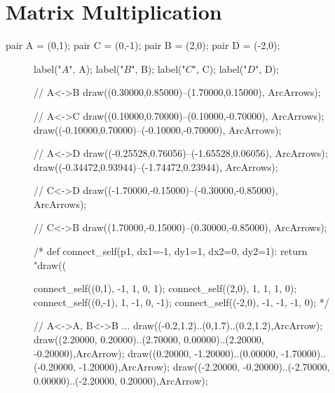 \documentclass[../gatm.tex]{subfiles}
\begin{document}
\section{Matrix Multiplication}

\newcommand{\indsize}{\scriptsize}
\newcommand{\colind}[2]{\displaystyle\smash{\mathop{#1}^{\raisebox{.5\normalbaselineskip}{$#2$}}}}
\newcommand{\rowind}[1]{\mbox{$#1$}}

\begin{asydef}
pair A = (0,1);
pair C = (0,-1);
pair B = (2,0);
pair D = (-2,0);
\end{asydef}

\begin{figure}[h]
	\begin{center}
		\begin{minipage}[b]{0.45\textwidth}
			\centering
			\begin{asy}[width=0.7\textwidth]

				label("$A$", A);
				label("$B$", B);
				label("$C$", C);
				label("$D$", D);
				
				// A<->B
				draw((0.30000,0.85000)--(1.70000,0.15000), ArcArrows);
				
				// A<->C
				draw((0.10000,0.70000)--(0.10000,-0.70000), ArcArrows);
				draw((-0.10000,0.70000)--(-0.10000,-0.70000), ArcArrows);
				
				// A<->D
				draw((-0.25528,0.76056)--(-1.65528,0.06056), ArcArrows);
				draw((-0.34472,0.93944)--(-1.74472,0.23944), ArcArrows);
				
				// C<->D
				draw((-1.70000,-0.15000)--(-0.30000,-0.85000), ArcArrows);
				
				// C<->B
				draw((1.70000,-0.15000)--(0.30000,-0.85000), ArcArrows);
				
				/*
				def connect_self(p1, dx1=-1, dy1=1, dx2=0, dy2=1):
					return "draw((%
				
				connect_self((0,1), -1, 1, 0, 1);
				connect_self((2,0), 1, 1, 1, 0);
				connect_self((0,-1), 1, -1, 0, -1);
				connect_self((-2,0), -1, -1, -1, 0);
				*/
				
				// A<->A, B<->B ...
				draw((-0.2,1.2)..(0,1.7)..(0.2,1.2),ArcArrow);
				draw((2.20000, 0.20000)..(2.70000, 0.00000)..(2.20000, -0.20000),ArcArrow);
				draw((0.20000, -1.20000)..(0.00000, -1.70000)..(-0.20000, -1.20000),ArcArrow);
				draw((-2.20000, -0.20000)..(-2.70000, 0.00000)..(-2.20000, 0.20000),ArcArrow);
			\end{asy}
		\end{minipage}
		\hfill
		\begin{minipage}[b]{0.45\textwidth}
			\centering
			\begin{asy}[width=0.7\textwidth]
			

\end{asy}
\end{minipage}
\end{center}
\end{figure}
\end{document}
